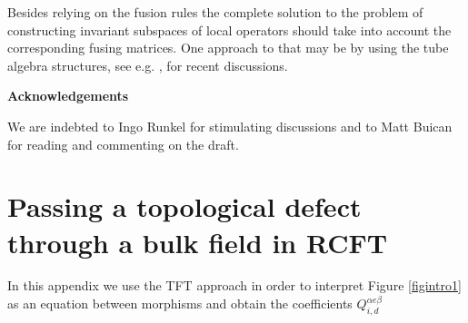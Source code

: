 \documentclass[a4paper,11pt]{article}
\theoremstyle{plain}
\theoremstyle{definition}
\begin{document}
Besides relying on the fusion rules the complete solution to the problem of constructing invariant subspaces of local operators should take into account the 
corresponding fusing matrices. One approach to that may be by using the tube algebra structures, see e.g. \cite{Bartsch_Bullimore}, \cite{paper1} for recent discussions. 


\begin{center}

{\bf Acknowledgements}
\end{center}

We are indebted to Ingo Runkel for stimulating discussions and to Matt Buican for reading and commenting on the draft.
\appendix



\section{Passing a topological defect through a bulk field in RCFT}\label{appendix0}

In this appendix we use the  TFT approach \cite{FRS1} in order to interpret Figure \ref{figintro1} as an equation between morphisms and obtain the coefficients $Q^{\alpha e \beta}_{i,d}$
\end{document}
